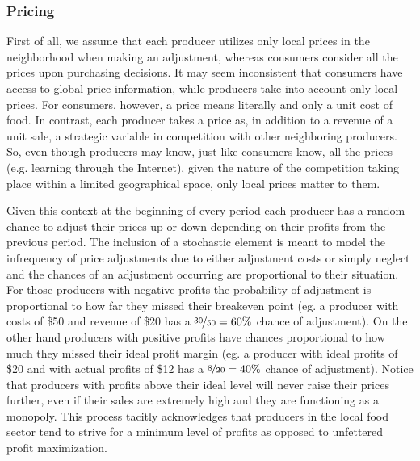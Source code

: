 \documentclass[11pt, oneside]{article}
\begin{document}
\subsubsection{Pricing}
First of all, we assume that each producer utilizes only local prices in the neighborhood when making an adjustment, whereas consumers consider all the prices upon purchasing decisions. It may seem inconsistent that consumers have access to global price information, while producers take into account only local prices. For consumers, however, a price means literally and only a unit cost of food. In contrast, each producer takes a price as, in addition to a revenue of a unit sale, a strategic variable in competition with other neighboring producers. So, even though producers may know, just like consumers know, all the prices (e.g. learning through the Internet), given the nature of the competition taking place within a limited geographical space, only local prices matter to them.

Given this context at the beginning of every period each producer has a random chance to adjust their prices up or down depending on their profits from the previous period. The inclusion of a stochastic element is meant to model the infrequency of price adjustments due to either adjustment costs or simply neglect and the chances of an adjustment occurring are proportional to their situation. For those producers with negative profits the probability of adjustment is proportional to how far they missed their breakeven point (eg. a producer with costs of \$50 and revenue of \$20 has a $\nicefrac{30}{50}=60\%$ chance of adjustment). On the other hand producers with positive profits have chances proportional to how much they missed their ideal profit margin (eg. a producer with ideal profits of \$20 and with actual profits of \$12 has a $\nicefrac{8}{20}=40\%$ chance of adjustment). Notice that producers with profits above their ideal level will never raise their prices further, even if their sales are extremely high and they are functioning as a monopoly. This process tacitly acknowledges that producers in the local food sector tend to strive for a minimum level of profits as opposed to unfettered profit maximization.
\end{document}
